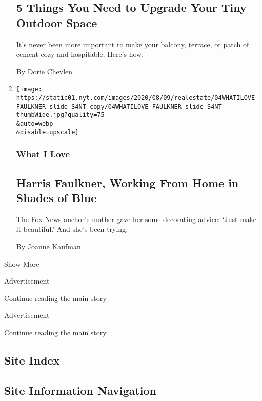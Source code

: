 \begin{enumerate}
  \hypertarget{5-things-you-need-to-upgrade-your-tiny-outdoor-space}{%
  \subsection{5 Things You Need to Upgrade Your Tiny Outdoor
  Space}\label{5-things-you-need-to-upgrade-your-tiny-outdoor-space}}

  It's never been more important to make your balcony, terrace, or patch
  of cement cozy and hospitable. Here's how.

  By Dorie Chevlen
\item
  \href{/2020/08/04/realestate/harris-faulkner-home-fox-news.html}{}

  \texttt{[image: https://static01.nyt.com/images/2020/08/09/realestate/04WHATILOVE-FAULKNER-slide-S4NT-copy/04WHATILOVE-FAULKNER-slide-S4NT-thumbWide.jpg?quality=75\\\&auto=webp\\\&disable=upscale]}

  \hypertarget{what-i-love}{%
  \subsubsection{What I Love}\label{what-i-love}}

  \hypertarget{harris-faulkner-working-from-home-in-shades-of-blue}{%
  \subsection{Harris Faulkner, Working From Home in Shades of
  Blue}\label{harris-faulkner-working-from-home-in-shades-of-blue}}

  The Fox News anchor's mother gave her some decorating advice: `Just
  make it beautiful.' And she's been trying.

  By Joanne Kaufman
\end{enumerate}

Show More

Advertisement

\protect\hyperlink{after-mid3}{Continue reading the main story}

Advertisement

\protect\hyperlink{after-mktg}{Continue reading the main story}

\hypertarget{site-index}{%
\subsection{Site Index}\label{site-index}}

\hypertarget{site-information-navigation}{%
\subsection{Site Information
Navigation}\label{site-information-navigation}}

